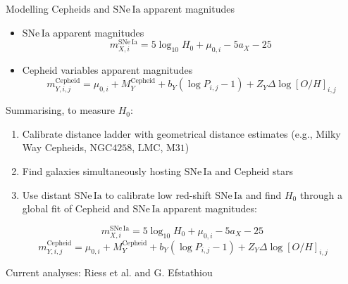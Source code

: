 \documentclass{beamer}
\newcommand{\LMC}{\mathrm{LMC}}
\newcommand{\MW}{\mathrm{MW}}
\newcommand{\Cepheid}{\mathrm{Cepheid}}
\newcommand{\SNe}{\mathrm{SNe\,Ia}}
\newcommand{\MAnd}{\mathrm{M31}}
\newcommand{\NGC}{\mathrm{NGC4258}}
\begin{document}
\begin{frame}{Modelling Cepheids and $\SNe$ apparent magnitudes}
\begin{itemize}
\item $\SNe$ apparent magnitudes
\begin{equation*}
m_{X,i}^{\SNe} =  5 \log_{10} H_0 + \mu_{0,i} - 5 a_X - 25 \, %
\end{equation*}
\item Cepheid variables apparent magnitudes 
\begin{equation*}\label{Eq:P-L-equation}
m_{Y,i,j}^{\Cepheid} = \mu_{0,i} + M_Y^{\Cepheid} + b_Y (\log P_{i,j}-1) + Z_Y \Delta \log[O/H]_{i,j}%
\end{equation*}
\end{itemize}
\end{frame}

\begin{frame}{Summarising, to measure $H_0$:}
\begin{enumerate}
\item Calibrate distance ladder with geometrical distance estimates (e.g., Milky Way Cepheids, $\NGC$, $\LMC$, $\MAnd$)
\item Find galaxies simultaneously hosting $\SNe$ and Cepheid stars
\item Use distant $\SNe$ to calibrate low red-shift $\SNe$ and find $H_0$ through a global fit of Cepheid and $\SNe$ apparent magnitudes:
\end{enumerate}
\begin{equation*}
m_{X,i}^{\SNe} =  5 \log_{10} H_0 + \mu_{0,i} - 5 a_X - 25 \, %
\end{equation*}
\begin{equation*}\label{Eq:P-L-equation}
m_{Y,i,j}^{\Cepheid} = \mu_{0,i} + M_Y^{\Cepheid} + b_Y (\log P_{i,j}-1) + Z_Y \Delta \log[O/H]_{i,j}%
\end{equation*}
\end{frame}

\begin{frame}{Current analyses: Riess et al. and G. Efstathiou}

\end{frame}
\end{document}

